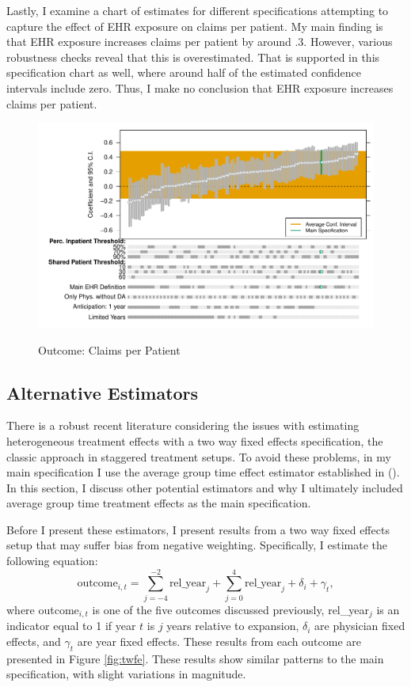 \documentclass[12pt]{article}
\begin{document}
Lastly, I examine a chart of estimates for different specifications attempting to capture the effect of EHR exposure on claims per patient. My main finding is that EHR exposure increases claims per patient by around .3. However, various robustness checks reveal that this is overestimated. That is supported in this specification chart as well, where around half of the estimated confidence intervals include zero. Thus, I make no conclusion that EHR exposure increases claims per patient. 

\begin{figure}[ht]
    \centering
    \caption{Outcome: Claims per Patient}
    \includegraphics[scale=.7]{Objects/claim_chart.pdf}
    \label{fig:cpp_chart}
\end{figure}



\subsection{Alternative Estimators}\label{app:estimators}

There is a robust recent literature considering the issues with estimating heterogeneous treatment effects with a two way fixed effects specification, the classic approach in staggered treatment setups. To avoid these problems, in my main specification I use the average group time effect estimator established in \citeauthor{callaway2021difference} (\citeyear{callaway2021difference}). In this section, I discuss other potential estimators and why I ultimately included average group time treatment effects as the main specification. 

Before I present these estimators, I present results from a two way fixed effects setup that may suffer bias from negative weighting. Specifically, I estimate the following equation:
$$\text{outcome}_{i,t}=\sum_{j=-4}^{-2} \text{rel\_year}_{j} + \sum_{j=0}^{4} \text{rel\_year}_{j} + \delta_i + \gamma_t,$$
where outcome$_{i,t}$ is one of the five outcomes discussed previously, rel\_year$_j$ is an indicator equal to 1 if year $t$ is $j$ years relative to expansion, $\delta_i$ are physician fixed effects, and $\gamma_t$ are year fixed effects.
These results from each outcome are presented in Figure \ref{fig:twfe}. These results show similar patterns to the main specification, with slight variations in magnitude. 
\end{document}
